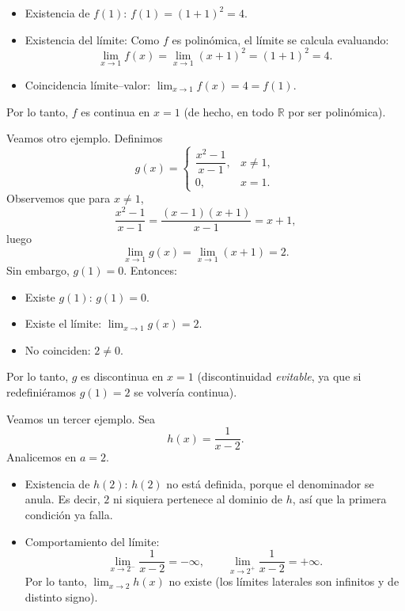 \documentclass{article}
\begin{document}
\begin{itemize}
  \item {\color{teal}Existencia de \(f(1)\):} \(f(1)=(1+1)^{2}=4\).
  \item {\color{teal}Existencia del límite:} Como \(f\) es polinómica, el límite se calcula evaluando:
  \[
    \lim_{x\to 1} f(x)=\lim_{x\to 1}(x+1)^{2}=(1+1)^{2}=4.
  \]
  \item {\color{teal}Coincidencia límite–valor:} \(\displaystyle \lim_{x\to1}f(x)=4=f(1)\).
\end{itemize}

Por lo tanto, {\color{teal}\(f\) es continua en \(x=1\)} (de hecho, en todo \(\mathbb R\) por ser polinómica).

\medskip
Veamos otro ejemplo. Definimos
\[
g(x)=
\begin{cases}
\dfrac{x^{2}-1}{x-1}, & x\neq 1,\\[6pt]
0, & x=1.
\end{cases}
\]
Observemos que para \(x\neq1\),
\[
\frac{x^{2}-1}{x-1}=\frac{(x-1)(x+1)}{x-1}=x+1,
\]
luego
\[
\lim_{x\to1}g(x)=\lim_{x\to1}(x+1)=2.
\]
Sin embargo, \(g(1)=0\). Entonces:

\begin{itemize}
  \item {\color{teal}Existe \(g(1)\):} \(g(1)=0\).
  \item {\color{teal}Existe el límite:} \(\displaystyle \lim_{x\to1}g(x)=2\).
  \item {\color{teal}No coinciden:} \(2\neq 0\).
\end{itemize}

Por lo tanto, {\color{teal}\(g\) es discontinua en \(x=1\)} (discontinuidad \emph{evitable}, ya que si redefiniéramos \(g(1)=2\) se volvería continua).

\medskip
Veamos un tercer ejemplo. Sea
\[
h(x)=\frac{1}{x-2}.
\]
Analicemos en \(a=2\).

\begin{itemize}
  \item {\color{teal}Existencia de \(h(2)\):} \(h(2)\) no está definida, porque el denominador se anula. Es decir, \(2\) ni siquiera pertenece al dominio de \(h\), así que la primera condición ya falla.
  \item {\color{teal}Comportamiento del límite:}
  \[
    \lim_{x\to 2^-}\frac{1}{x-2}=-\infty,
    \qquad
    \lim_{x\to 2^+}\frac{1}{x-2}=+\infty.
  \]
  Por lo tanto, \(\displaystyle \lim_{x\to 2}h(x)\) no existe (los límites laterales son infinitos y de distinto signo).
\end{itemize}
\end{document}
